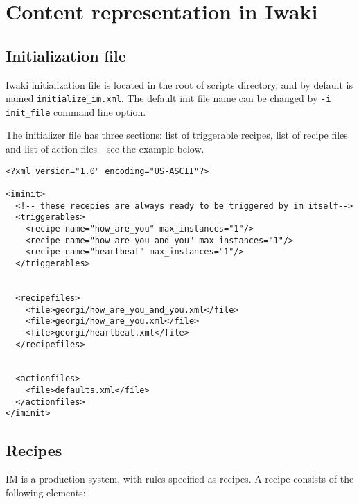 \chapter{Content representation in Iwaki}
\label{Chapter3}

\section{Initialization file}

Iwaki initialization file is located in the root of scripts directory, and by default is named \texttt{initialize\_im.xml}. The default init file name can be changed by \texttt{-i init\_file} command line option.

The initializer file has three sections: list of triggerable recipes, list of recipe files and list of action files---see the example below.

\lstset{language=XML}
\begin{lstlisting}
<?xml version="1.0" encoding="US-ASCII"?>
 
<iminit>
  <!-- these recepies are always ready to be triggered by im itself-->
  <triggerables>
    <recipe name="how_are_you" max_instances="1"/>
    <recipe name="how_are_you_and_you" max_instances="1"/>
    <recipe name="heartbeat" max_instances="1"/>
  </triggerables>

 
  <recipefiles>
    <file>georgi/how_are_you_and_you.xml</file>
    <file>georgi/how_are_you.xml</file>
    <file>georgi/heartbeat.xml</file>
  </recipefiles>


  <actionfiles>
    <file>defaults.xml</file>
  </actionfiles>
</iminit>
\end{lstlisting}

\section{Recipes}
\label{sec:Ch3Recipes}

IM is a production system, with rules specified as recipes. A recipe consists of the following elements:

